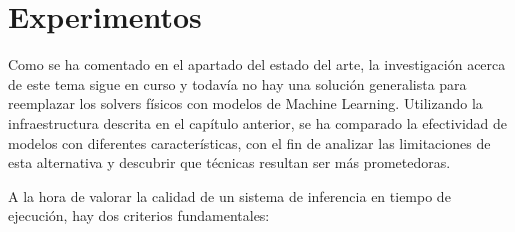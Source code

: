 \chapter{Experimentos}
\label{cap:experimentos}

Como se ha comentado en el apartado del estado del arte, la investigación acerca de este tema sigue en curso y todavía no hay una solución generalista para reemplazar los solvers físicos con modelos de Machine Learning. Utilizando la infraestructura descrita en el capítulo anterior, se ha comparado la efectividad de modelos con diferentes características, con el fin de analizar las limitaciones de esta alternativa y descubrir que técnicas resultan ser más prometedoras. \newline

A la hora de valorar la calidad de un sistema de inferencia en tiempo de ejecución, hay dos criterios fundamentales:
